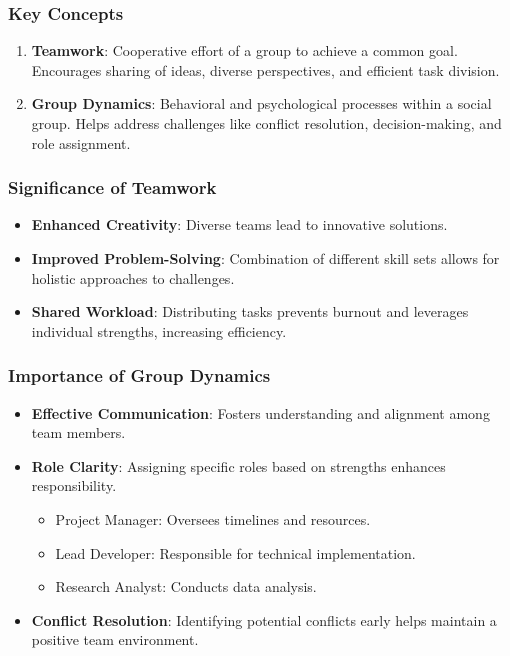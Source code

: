 \documentclass[aspectratio=169]{beamer}
\begin{document}
\begin{frame}[fragile]
    \frametitle{Key Concepts}
    \begin{enumerate}
        \item \textbf{Teamwork}: Cooperative effort of a group to achieve a common goal. Encourages sharing of ideas, diverse perspectives, and efficient task division.
        
        \item \textbf{Group Dynamics}: Behavioral and psychological processes within a social group. Helps address challenges like conflict resolution, decision-making, and role assignment.
    \end{enumerate}
\end{frame}

\begin{frame}[fragile]
    \frametitle{Significance of Teamwork}
    \begin{itemize}
        \item \textbf{Enhanced Creativity}: Diverse teams lead to innovative solutions.
        \item \textbf{Improved Problem-Solving}: Combination of different skill sets allows for holistic approaches to challenges.
        \item \textbf{Shared Workload}: Distributing tasks prevents burnout and leverages individual strengths, increasing efficiency.
    \end{itemize}
\end{frame}

\begin{frame}[fragile]
    \frametitle{Importance of Group Dynamics}
    \begin{itemize}
        \item \textbf{Effective Communication}: Fosters understanding and alignment among team members.
        \item \textbf{Role Clarity}: Assigning specific roles based on strengths enhances responsibility.
            \begin{itemize}
                \item Project Manager: Oversees timelines and resources.
                \item Lead Developer: Responsible for technical implementation.
                \item Research Analyst: Conducts data analysis.
            \end{itemize}
        \item \textbf{Conflict Resolution}: Identifying potential conflicts early helps maintain a positive team environment.
    \end{itemize}
\end{frame}
\end{document}
